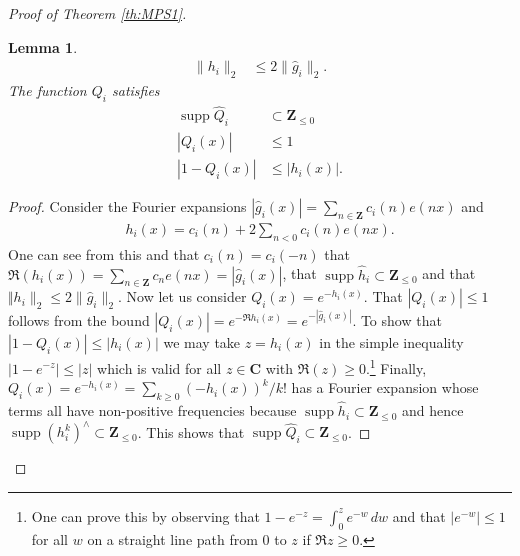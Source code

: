\documentclass[11pt, reqno]{amsart}
\newtheorem{lemma}[theorem]{Lemma}
\DeclareMathOperator\supp{supp}
\begin{document}
\begin{proof}[Proof of Theorem \ref{th:MPS1}]
\begin{lemma}
\begin{align*}
        \lVert h_i\rVert_2&\leqslant  2\lVert \hat{g}_i\rVert_2.
        \end{align*}
    The function $Q_i$ satisfies
    \begin{align*}
        \supp \hat{Q}_i&\subset \mathbf{Z}_{\leqslant 0}\\
        |Q_i(x)|&\leqslant 1\\
        |1-Q_i(x)|&\leqslant |h_i(x)|.
        \end{align*}
\end{lemma}
\begin{proof}
Consider the Fourier expansions $|\hat{g}_i(x)|=\sum_{n\in\mathbf{Z}}c_i(n)e(nx)$ and 
    \begin{align*}
        h_i(x)=c_i(n)+2\sum_{n< 0}c_i(n)e(nx).
    \end{align*}
    One can see from this and that $c_i(n)=c_i(-n)$ that $\Re \left(h_i(x)\right)=\sum_{n\in\mathbf{Z}}c_ne(nx)= |\hat{g}_i(x)|$, that $\supp \hat{h}_i\subset \mathbf{Z}_{\leqslant 0}$ and that $\Vert h_i\rVert_2\leqslant 2\lVert \hat{g}_i\rVert_2$. Now let us consider $Q_i(x)=e^{-h_i(x)}$. That $|Q_i(x)|\leqslant 1$ follows from the bound $|Q_i(x)|=e^{-\Re h_i(x)}=e^{-|\hat{g}_i(x)|}$. To show that $|1-Q_i(x)|\leqslant|h_i(x)|$ we may take $z=h_i(x)$ in the simple inequality $|1-e^{-z}|\leqslant |z|$ which is valid for all $z\in\mathbf{C}$ with $\Re(z)\geqslant 0$.\footnote{One can prove this by observing that $1-e^{-z}=\int_0^ze^{-w}\,dw$ and that $|e^{-w}|\leqslant 1$ for all $w$ on a straight line path from $0$ to $z$ if $\Re z\geqslant 0$.} Finally, $Q_i(x)=e^{-h_i(x)}=\sum_{k\geqslant0}(-h_i(x))^k/k!$ has a Fourier expansion whose terms all have non-positive frequencies because $\supp \hat{h}_i\subset\mathbf{Z}_{\leqslant 0}$ and hence $\supp (h_i^k)^\wedge\subset\mathbf{Z}_{\leqslant 0}$. This shows that $\supp \hat{Q}_i\subset\mathbf{Z}_{\leqslant 0}$.


\end{proof}
\end{proof}
\end{document}
